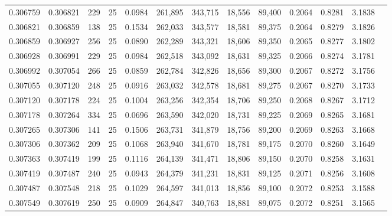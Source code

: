 \begin{tabular}{rrrrrrrrrrrrr}
0.306759 & 0.306821 &   229 &  25 &                                     0.0984 & 261,895 & 343,715 &  18,556 &  89,400 & 0.2064 & 0.8281 & 3.1838 \\
0.306821 & 0.306859 &   138 &  25 &                                     0.1534 & 262,033 & 343,577 &  18,581 &  89,375 & 0.2064 & 0.8279 & 3.1826 \\
0.306859 & 0.306927 &   256 &  25 &                                     0.0890 & 262,289 & 343,321 &  18,606 &  89,350 & 0.2065 & 0.8277 & 3.1802 \\
0.306928 & 0.306991 &   229 &  25 &                                     0.0984 & 262,518 & 343,092 &  18,631 &  89,325 & 0.2066 & 0.8274 & 3.1781 \\
0.306992 & 0.307054 &   266 &  25 &                                     0.0859 & 262,784 & 342,826 &  18,656 &  89,300 & 0.2067 & 0.8272 & 3.1756 \\
0.307055 & 0.307120 &   248 &  25 &                                     0.0916 & 263,032 & 342,578 &  18,681 &  89,275 & 0.2067 & 0.8270 & 3.1733 \\
0.307120 & 0.307178 &   224 &  25 &                                     0.1004 & 263,256 & 342,354 &  18,706 &  89,250 & 0.2068 & 0.8267 & 3.1712 \\
0.307178 & 0.307264 &   334 &  25 &                                     0.0696 & 263,590 & 342,020 &  18,731 &  89,225 & 0.2069 & 0.8265 & 3.1681 \\
0.307265 & 0.307306 &   141 &  25 &                                     0.1506 & 263,731 & 341,879 &  18,756 &  89,200 & 0.2069 & 0.8263 & 3.1668 \\
0.307306 & 0.307362 &   209 &  25 &                                     0.1068 & 263,940 & 341,670 &  18,781 &  89,175 & 0.2070 & 0.8260 & 3.1649 \\
0.307363 & 0.307419 &   199 &  25 &                                     0.1116 & 264,139 & 341,471 &  18,806 &  89,150 & 0.2070 & 0.8258 & 3.1631 \\
0.307419 & 0.307487 &   240 &  25 &                                     0.0943 & 264,379 & 341,231 &  18,831 &  89,125 & 0.2071 & 0.8256 & 3.1608 \\
0.307487 & 0.307548 &   218 &  25 &                                     0.1029 & 264,597 & 341,013 &  18,856 &  89,100 & 0.2072 & 0.8253 & 3.1588 \\
0.307549 & 0.307619 &   250 &  25 &                                     0.0909 & 264,847 & 340,763 &  18,881 &  89,075 & 0.2072 & 0.8251 & 3.1565 \\

\end{tabular}
